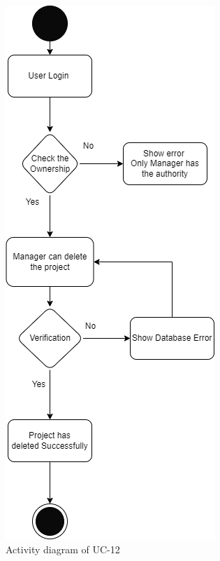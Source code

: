 \begin{figure}[H]
    \centering
    \includegraphics[scale=0.5]{./diagrams/Activity Diagram/ad-12.png}
    \caption{Activity diagram of UC-12}
    \label{fig:act-12}

\end{figure}


